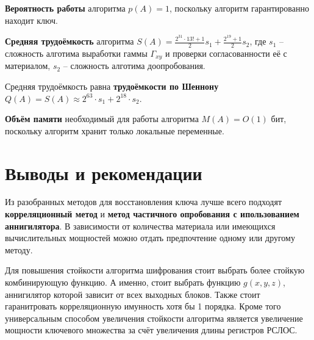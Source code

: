 \documentclass[a4paper,12pt]{article}
\theoremstyle{definition}
\begin{document}
	\textbf{Вероятность работы} алгоритма $p(A)=1$, поскольку алгоритм гарантированно находит ключ. 
	
	\textbf{Средняя трудоёмкость} алгоритма $S(A)= \frac{2^{31} \cdot 13! + 1}{2} s_1 + \frac{2^{19} + 1}{2} s_2$, где $s_1$ -- сложность алготима выработки гаммы $\Gamma_{x y}$ и проверки согласованности её с материалом, $s_2$ -- сложность алготима доопробования. 
	
	Средняя трудоёмкость равна \textbf{трудоёмкости по Шеннону} $Q(A) = S(A) \approx 2^{63} \cdot s_1 + 2^{18} \cdot s_2$.
	
	\textbf{Объём памяти} необходимый для работы алгоритма $M(A) = O(1)$ бит, поскольку алгоритм хранит только локальные переменные.
	
	\section{Выводы и рекомендации}
	
	Из разобранных методов для восстановления ключа лучше всего подходят \textbf{корреляционный метод} и \textbf{метод частичного опробования с ипользованием аннигилятора}. В зависимости от количества материала или имеющихся вычислительных мощностей можно отдать предпочтение одному или другому методу. 
	
	Для повышения стойкости алгоритма шифрования стоит выбрать более стойкую комбинирующую функцию. А именно, стоит выбрать функцию $g(x,y,z)$, аннигилятор которой зависит от всех выходных блоков. Также стоит гаранитровать корреляционную имунность хотя бы 1 порядка. Кроме того универсальным способом увеличения стойкости алгоритма является увеличение мощности ключевого множества за счёт увеличения длины регистров РСЛОС.
			
\end{document}

